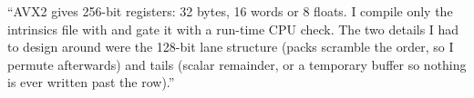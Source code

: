 \begin{sound}
``AVX2 gives 256-bit registers: 32 bytes, 16 words or 8 floats. I compile only the intrinsics file with  and gate it with a run-time CPU check. The two details I had to design around were the 128-bit lane structure (packs scramble the order, so I permute afterwards) and tails (scalar remainder, or a temporary buffer so nothing is ever written past the row).''
\end{sound}
